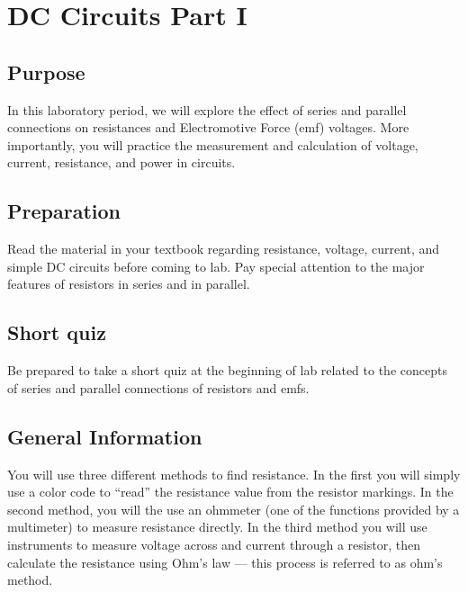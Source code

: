 

\chapter {DC Circuits Part I}

\section{Purpose}  
In this laboratory period, we will explore the effect of series and parallel connections on resistances and Electromotive Force (emf) voltages.  More importantly, you will practice the measurement and calculation of voltage, current, resistance, and power in circuits.

\section{Preparation}  
Read the material in your textbook regarding resistance, voltage, current, and simple DC circuits before coming to lab. Pay special attention to the major features of resistors in series and in parallel.


\section {Short quiz}  Be prepared to take a short quiz at the beginning of lab related to the concepts of series and parallel connections of resistors and emfs.

\section{General Information}
You will use three different methods to find resistance.  In the first you will simply use a color code to ``read'' the resistance value from the resistor markings. In the second method, you will the use an ohmmeter (one of the functions provided by a multimeter) to measure resistance directly.  In the third method you will use instruments to measure voltage across and current through a resistor, then calculate the resistance using Ohm's law --- this process is  referred to as ohm's method.

